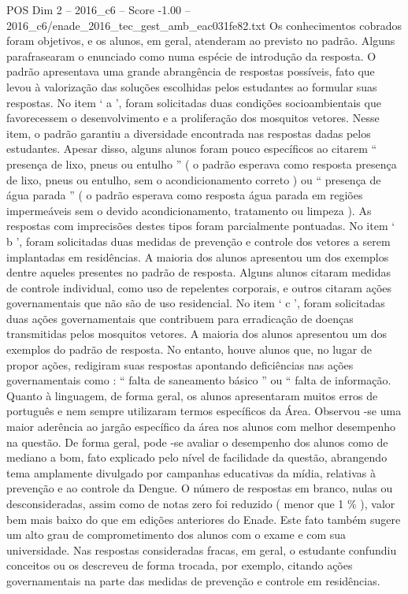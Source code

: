 \begin{textsample}{POS Dim 2 – 2016\_c6 – Score -1.00 – 2016\_c6/enade\_2016\_tec\_gest\_amb\_eac031fe82.txt}
Os conhecimentos cobrados foram objetivos, e os alunos, em geral, atenderam ao previsto no padrão.
Alguns parafrasearam o enunciado como numa espécie de introdução da resposta.
O padrão apresentava uma grande abrangência de respostas possíveis, fato que levou à valorização das soluções escolhidas pelos estudantes ao formular suas respostas.
No item ‘ a ’, foram solicitadas duas condições socioambientais que favorecessem o desenvolvimento e a proliferação dos mosquitos vetores.
Nesse item, o padrão garantiu a diversidade encontrada nas respostas dadas pelos estudantes.
Apesar disso, alguns alunos foram pouco específicos ao citarem “ presença de lixo, pneus ou entulho ” ( o padrão esperava como resposta presença de lixo, pneus ou entulho, sem o acondicionamento correto ) ou “ presença de água parada ” ( o padrão esperava como resposta água parada em regiões impermeáveis sem o devido acondicionamento, tratamento ou limpeza ).
As respostas com imprecisões destes tipos foram parcialmente pontuadas.
No item ‘ b ’, foram solicitadas duas medidas de prevenção e controle dos vetores a serem implantadas em residências.
A maioria dos alunos apresentou um dos exemplos dentre aqueles presentes no padrão de resposta.
Alguns alunos citaram medidas de controle individual, como uso de repelentes corporais, e outros citaram ações governamentais que não são de uso residencial.
No item ‘ c ’, foram solicitadas duas ações governamentais que contribuem para erradicação de doenças transmitidas pelos mosquitos vetores.
A maioria dos alunos apresentou um dos exemplos do padrão de resposta.
No entanto, houve alunos que, no lugar de propor ações, redigiram suas respostas apontando deficiências nas ações governamentais como : “ falta de saneamento básico ” ou “ falta de informação.
Quanto à linguagem, de forma geral, os alunos apresentaram muitos erros de português e nem sempre utilizaram termos específicos da Área.
Observou -se uma maior aderência ao jargão específico da área nos alunos com melhor desempenho na questão.
De forma geral, pode -se avaliar o desempenho dos alunos como de mediano a bom, fato explicado pelo nível de facilidade da questão, abrangendo tema amplamente divulgado por campanhas educativas da mídia, relativas à prevenção e ao controle da Dengue.
O número de respostas em branco, nulas ou desconsideradas, assim como de notas zero foi reduzido ( menor que 1 \% ), valor bem mais baixo do que em edições anteriores do Enade.
Este fato também sugere um alto grau de comprometimento dos alunos com o exame e com sua universidade.
Nas respostas consideradas fracas, em geral, o estudante confundiu conceitos ou os descreveu de forma trocada, por exemplo, citando ações governamentais na parte das medidas de prevenção e controle em residências.

\end{textsample}
